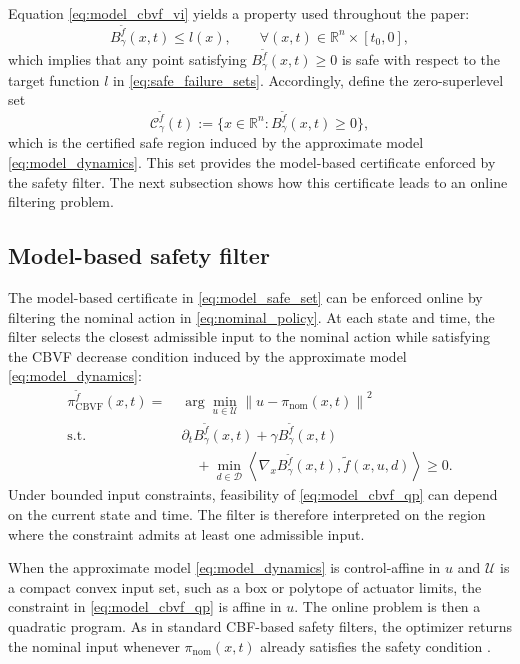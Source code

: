 \documentclass[letterpaper,10pt,conference]{ieeeconf}
\newcommand{\R}{\mathbb{R}}
\newcommand{\Bm}{B_{\gamma}^{\tilde f}}
\newcommand{\fapp}{\widetilde{f}}
\newcommand{\xv}{x}
\newcommand{\uv}{u}
\newcommand{\dv}{d}
\newcommand{\Uv}{\mathcal{U}}
\newcommand{\Dv}{\mathcal{D}}
\newcommand{\norm}[1]{\left\lVert #1 \right\rVert}
\newcommand{\ip}[2]{\left\langle #1,#2 \right\rangle}
\begin{document}
Equation \eqref{eq:model_cbvf_vi} yields a property used throughout the paper:
\begin{equation}
    \Bm(\xv,t)\le l(\xv),
    \qquad \forall (\xv,t)\in\R^n\times[t_0,0],
    \label{eq:Bm_le_l}
\end{equation}
which implies that any point satisfying $\Bm(\xv,t)\ge 0$ is safe with respect
to the target function $l$ in \eqref{eq:safe_failure_sets}. Accordingly, define
the zero-superlevel set
\begin{equation}
    \mathcal{C}_{\gamma}^{\tilde f}(t)
    :=
    \{\xv\in\R^n : \Bm(\xv,t)\ge 0\},
    \label{eq:model_safe_set}
\end{equation}
which is the certified safe region induced by the approximate model
\eqref{eq:model_dynamics}. This set provides the model-based certificate
enforced by the safety filter. The next subsection shows how this certificate
leads to an online filtering problem.


\subsection{Model-based safety filter}

The model-based certificate in \eqref{eq:model_safe_set} can be enforced online
by filtering the nominal action in \eqref{eq:nominal_policy}. At each state and
time, the filter selects the closest admissible input to the nominal action
while satisfying the CBVF decrease condition induced by the approximate model
\eqref{eq:model_dynamics}:
\begin{equation}
\label{eq:model_cbvf_qp}
\begin{aligned}
\pi_{\mathrm{CBVF}}^{\tilde f}(\xv,t)
=\;& \arg\min_{\uv\in\Uv}
\norm{\uv-\pi_{\mathrm{nom}}(\xv,t)}^2 \\
\text{s.t.}\;&
\partial_t \Bm(\xv,t) + \gamma \Bm(\xv,t) \\
&\quad + \min_{\dv\in\Dv}
\ip{\nabla_{\xv}\Bm(\xv,t)}{\fapp(\xv,\uv,\dv)}
\ge 0.
\end{aligned}
\end{equation}
Under bounded input constraints, feasibility of \eqref{eq:model_cbvf_qp} can
depend on the current state and time. The filter is therefore interpreted on
the region where the constraint admits at least one admissible input.

When the approximate model \eqref{eq:model_dynamics} is control-affine in
$\uv$ and $\Uv$ is a compact convex input set, such as a box or polytope of
actuator limits, the constraint in \eqref{eq:model_cbvf_qp} is affine in
$\uv$. The online problem is then a quadratic program. As in standard
CBF-based safety filters, the optimizer returns the nominal input whenever
$\pi_{\mathrm{nom}}(\xv,t)$ already satisfies the safety condition
\cite{ames2019cbf,choi2021cbvf}.
\end{document}
